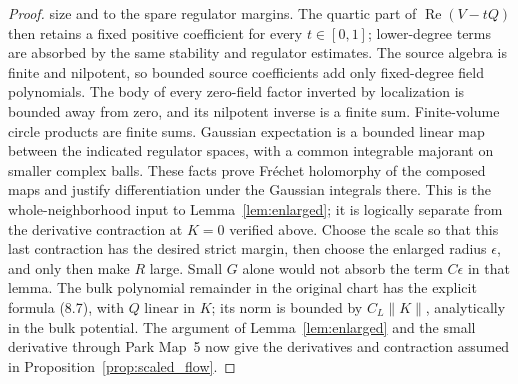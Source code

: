\documentclass[11pt]{article}
\begin{document}
\begin{proof}
size and to the spare regulator margins. The quartic part of
\(\operatorname{Re}(V-tQ)\) then retains a fixed positive
coefficient for every \(t\in[0,1]\); lower-degree terms are
absorbed by the same stability and regulator estimates. The
source algebra is finite and nilpotent, so bounded source
coefficients add only fixed-degree field polynomials. The body
of every zero-field factor inverted by localization is bounded
away from zero, and its nilpotent inverse is a finite sum.
Finite-volume circle products are finite sums. Gaussian expectation
is a bounded linear map between the indicated regulator spaces,
with a common integrable majorant on smaller complex balls.
These facts prove Fr\'echet holomorphy of the composed maps and
justify differentiation under the Gaussian integrals there. This is the whole-neighborhood
input to Lemma~\ref{lem:enlarged}; it is logically separate from
the derivative contraction at \(K=0\) verified above. Choose the
scale so that this last contraction has the desired strict margin,
then choose the enlarged radius \(\epsilon\), and only then make
\(R\) large. Small \(G\) alone would not absorb the term
\(C\epsilon\) in that lemma.
The bulk polynomial remainder in the original chart
has the explicit formula (8.7), with \(Q\) linear in \(K\);
its norm is bounded by \(C_L\|K\|\), analytically in
the bulk potential. The argument of
Lemma~\ref{lem:enlarged} and the small derivative
through Park Map~5 now give the derivatives and
contraction assumed in Proposition~\ref{prop:scaled_flow}.


\end{proof}
\end{document}
